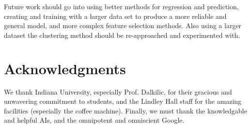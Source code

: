 \documentclass[fleqn,10pt]{SelfArx} %
\begin{document}
Future work should go into using better methods for regression and prediction, creating and training with a larger data set to produce a more
reliable and general model, and more complex feature selection methods.  Also using a larger dataset the clustering method should be re-approached and experimented with.


\section*{Acknowledgments} %

We thank Indiana University, especially Prof. Dalkilic, for their gracious and unwavering commitment to students, and the Lindley Hall staff for the amazing facilities (especially the coffee machine).
Finally, we must thank the knowledgable and helpful AIs, and the omnipotent and omniscient Google.








\end{document}
